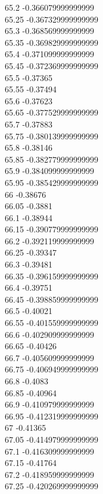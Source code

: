 {65.2	-0.366079999999999\\
65.25	-0.367329999999999\\
65.3	-0.368569999999999\\
65.35	-0.369829999999999\\
65.4	-0.371099999999999\\
65.45	-0.372369999999999\\
65.5	-0.37365\\
65.55	-0.37494\\
65.6	-0.37623\\
65.65	-0.377529999999999\\
65.7	-0.37883\\
65.75	-0.380139999999999\\
65.8	-0.38146\\
65.85	-0.382779999999999\\
65.9	-0.384099999999999\\
65.95	-0.385429999999999\\
66	-0.38676\\
66.05	-0.3881\\
66.1	-0.38944\\
66.15	-0.390779999999999\\
66.2	-0.392119999999999\\
66.25	-0.39347\\
66.3	-0.39481\\
66.35	-0.396159999999999\\
66.4	-0.39751\\
66.45	-0.398859999999999\\
66.5	-0.40021\\
66.55	-0.401559999999999\\
66.6	-0.402909999999999\\
66.65	-0.40426\\
66.7	-0.405609999999999\\
66.75	-0.406949999999999\\
66.8	-0.4083\\
66.85	-0.40964\\
66.9	-0.410979999999999\\
66.95	-0.412319999999999\\
67	-0.41365\\
67.05	-0.414979999999999\\
67.1	-0.416309999999999\\
67.15	-0.41764\\
67.2	-0.418959999999999\\
67.25	-0.420269999999999\\
}

